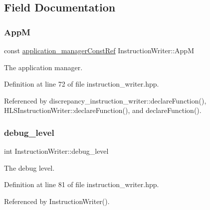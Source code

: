 \subsection{Field Documentation}
\mbox{\label{classInstructionWriter_adc648b325e6ccab17a41fb16f503ca92}} 
\subsubsection{\texorpdfstring{AppM}{AppM}}
{\footnotesize\ttfamily const \hyperlink{application__manager_8hpp_abb985163a2a3fb747f6f03b1eaadbb44}{application\+\_\+manager\+Const\+Ref} Instruction\+Writer\+::\+AppM\hspace{0.3cm}{\ttfamily [protected]}}



The application manager. 



Definition at line 72 of file instruction\+\_\+writer.\+hpp.



Referenced by discrepancy\+\_\+instruction\+\_\+writer\+::declare\+Function(), H\+L\+S\+Instruction\+Writer\+::declare\+Function(), and declare\+Function().

\mbox{\label{classInstructionWriter_afaf09851e265153f4b2d40a71460177f}} 
\subsubsection{\texorpdfstring{debug\+\_\+level}{debug\_level}}
{\footnotesize\ttfamily int Instruction\+Writer\+::debug\+\_\+level\hspace{0.3cm}{\ttfamily [protected]}}



The debug level. 



Definition at line 81 of file instruction\+\_\+writer.\+hpp.



Referenced by Instruction\+Writer().

\mbox{\label{classInstructionWriter_a8d06403d2bdb8f66559e2d4c2f1f1b48}} 
